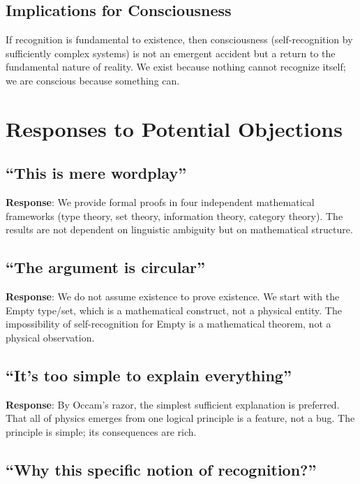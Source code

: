 \documentclass[12pt,a4paper]{article}
\begin{document}
\subsection{Implications for Consciousness}

If recognition is fundamental to existence, then consciousness (self-recognition by sufficiently complex systems) is not an emergent accident but a return to the fundamental nature of reality. We exist because nothing cannot recognize itself; we are conscious because something can.

\section{Responses to Potential Objections}

\subsection{``This is mere wordplay''}

\textbf{Response}: We provide formal proofs in four independent mathematical frameworks (type theory, set theory, information theory, category theory). The results are not dependent on linguistic ambiguity but on mathematical structure.

\subsection{``The argument is circular''}

\textbf{Response}: We do not assume existence to prove existence. We start with the Empty type/set, which is a mathematical construct, not a physical entity. The impossibility of self-recognition for Empty is a mathematical theorem, not a physical observation.

\subsection{``It's too simple to explain everything''}

\textbf{Response}: By Occam's razor, the simplest sufficient explanation is preferred. That all of physics emerges from one logical principle is a feature, not a bug. The principle is simple; its consequences are rich.

\subsection{``Why this specific notion of recognition?''}
\end{document}
